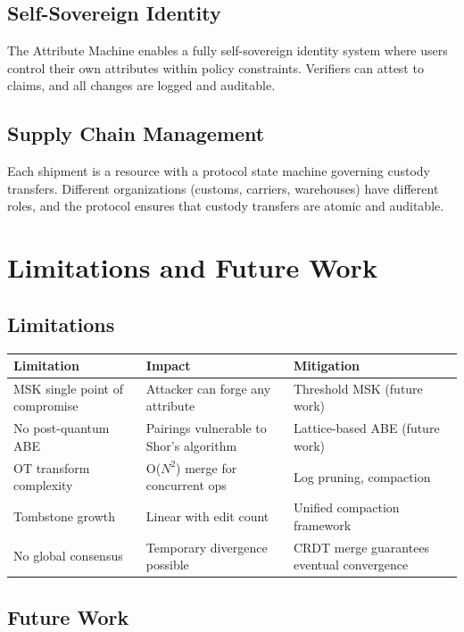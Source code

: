 \documentclass[sigconf,nonacm]{acmart}
\begin{document}
\subsection{Self-Sovereign Identity}

The Attribute Machine enables a fully self-sovereign identity system where users control their own attributes within policy constraints. Verifiers can attest to claims, and all changes are logged and auditable.

\subsection{Supply Chain Management}

Each shipment is a resource with a protocol state machine governing custody transfers. Different organizations (customs, carriers, warehouses) have different roles, and the protocol ensures that custody transfers are atomic and auditable.

\section{Limitations and Future Work}

\subsection{Limitations}

\vspace{4pt}
\begin{tabularx}{\columnwidth}{l>{\hsize=0.8\hsize}X>{\hsize=1.2\hsize}X}
\toprule
\textbf{Limitation} & \textbf{Impact} & \textbf{Mitigation} \\
\midrule
MSK single point of compromise & Attacker can forge any attribute & Threshold MSK (future work) \\
No post-quantum ABE & Pairings vulnerable to Shor's algorithm & Lattice-based ABE (future work) \\
OT transform complexity & O($N^2$) merge for concurrent ops & Log pruning, compaction \\
Tombstone growth & Linear with edit count & Unified compaction framework \\
No global consensus & Temporary divergence possible & CRDT merge guarantees eventual convergence \\
\bottomrule
\end{tabularx}

\subsection{Future Work}
\end{document}
